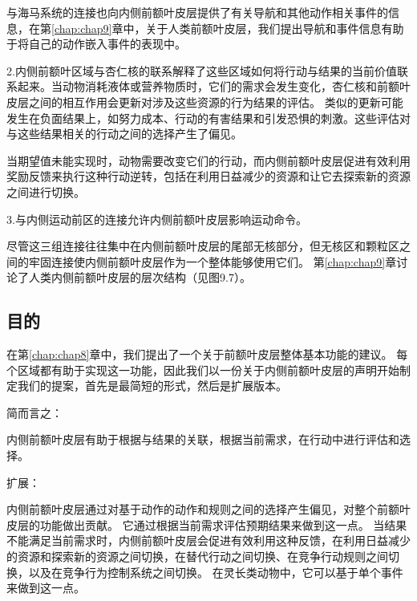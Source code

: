 与海马系统的连接也向内侧前额叶皮层提供了有关导航和其他动作相关事件的信息，在第\ref{chap:chap9}章中，关于人类前额叶皮层，我们提出导航和事件信息有助于将自己的动作嵌入事件的表现中。\par


2.内侧前额叶区域与杏仁核的联系解释了这些区域如何将行动与结果的当前价值联系起来。当动物消耗液体或营养物质时，它们的需求会发生变化，杏仁核和前额叶皮层之间的相互作用会更新对涉及这些资源的行为结果的评估。
类似的更新可能发生在负面结果上，如努力成本、行动的有害结果和引发恐惧的刺激。这些评估对与这些结果相关的行动之间的选择产生了偏见。\par


当期望值未能实现时，动物需要改变它们的行动，而内侧前额叶皮层促进有效利用奖励反馈来执行这种行动逆转，包括在利用日益减少的资源和让它去探索新的资源之间进行切换。\par


3.与内侧运动前区的连接允许内侧前额叶皮层影响运动命令。\par

尽管这三组连接往往集中在内侧前额叶皮层的尾部无核部分，但无核区和颗粒区之间的牢固连接使内侧前额叶皮层作为一个整体能够使用它们。
第\ref{chap:chap9}章讨论了人类内侧前额叶皮层的层次结构（见图9.7）。\par



\subsection{目的}

在第\ref{chap:chap8}章中，我们提出了一个关于前额叶皮层整体基本功能的建议。
每个区域都有助于实现这一功能，因此我们以一份关于内侧前额叶皮层的声明开始制定我们的提案，首先是最简短的形式，然后是扩展版本。\par


简而言之：\par
内侧前额叶皮层有助于根据与结果的关联，根据当前需求，在行动中进行评估和选择。\par
扩展：\par
内侧前额叶皮层通过对基于动作的动作和规则之间的选择产生偏见，对整个前额叶皮层的功能做出贡献。
它通过根据当前需求评估预期结果来做到这一点。
当结果不能满足当前需求时，内侧前额叶皮层会促进有效利用这种反馈，在利用日益减少的资源和探索新的资源之间切换，在替代行动之间切换、在竞争行动规则之间切换，以及在竞争行为控制系统之间切换。
在灵长类动物中，它可以基于单个事件来做到这一点。\par



